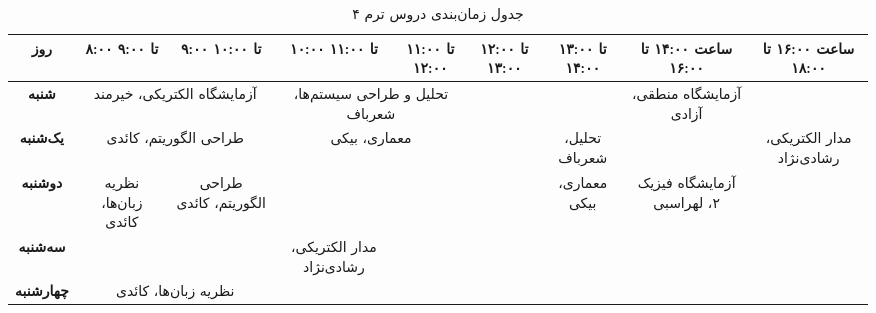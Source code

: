 \documentclass{article}
\begin{document}
	
 	\begin{sidewaystable}[h]
		\begin{center}	
 			\caption{جدول زمان‌بندی دروس ترم ۴}	
			\begin{tabular}{|c|c|c|c|c|c|c|c|c|c|c|}
				\hline
                 				روز &
			۸:۰۰ تا ۹:۰۰ & ۹:۰۰ تا ۱۰:۰۰ &
			۱۰:۰۰ تا ۱۱:۰۰ & ۱۱:۰۰ تا ۱۲:۰۰ &
			۱۲:۰۰ تا ۱۳:۰۰ & ۱۳:۰۰ تا ۱۴:۰۰ &
				\multicolumn{2}{|c|}{ساعت ۱۴:۰۰ تا ۱۶:۰۰} &
				\multicolumn{2}{|c|}{ساعت ۱۶:۰۰ تا ۱۸:۰۰} \\
				\hline
				\hline
				                \textbf{شنبه} &
				\multicolumn{2}{|c|}{آزمایشگاه الکتریکی، خیرمند} &
				\multicolumn{2}{|c|}{تحلیل و طراحی سیستم‌ها، شعرباف} &
				\multicolumn{2}{|c|}{} &
				\multicolumn{2}{|c|}{آزمایشگاه منطقی، آزادی} &
				\multicolumn{2}{|c|}{} \\
				\hline
				
								\textbf{یک‌شنبه} &
				\multicolumn{2}{|c|}{طراحی الگوریتم، کائدی} &
				\multicolumn{2}{|c|}{معماری، بیکی} &
				 & تحلیل، شعرباف &
				\multicolumn{2}{|c|}{} &
				\multicolumn{2}{|c|}{مدار الکتریکی، رشادی‌نژاد} \\
				\hline
				
								\textbf{دوشنبه} &
				نظریه زبان‌ها، کائدی & طراحی الگوریتم، کائدی &
				\multicolumn{2}{|c|}{} &
				& معماری، بیکی &
				\multicolumn{2}{|c|}{آزمایشگاه فیزیک ۲، لهراسبی} &
				\multicolumn{2}{|c|}{} \\
				\hline
								\textbf{سه‌شنبه} &
				\multicolumn{2}{|c|}{} &
                 مدار الکتریکی، رشادی‌نژاد& &
				\multicolumn{2}{|c|}{} &
				\multicolumn{2}{|c|}{} &
				\multicolumn{2}{|c|}{} \\
				\hline
								\textbf{چهارشنبه} &
				\multicolumn{2}{|c|}{نظریه زبان‌ها، کائدی} &
				\multicolumn{2}{|c|}{} &
				\multicolumn{2}{|c|}{} &
				\multicolumn{2}{|c|}{} &
				\multicolumn{2}{|c|}{} \\
				\hline
            \end{tabular}
		\end{center}
 	\end{sidewaystable}
\end{document}
